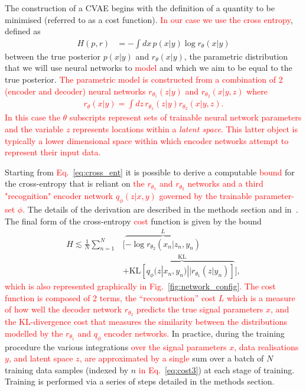 \documentclass[%
showpacs,
nofootinbib,
 amsmath,amssymb,
 aps,
 twocolumn,
 prl,
 reprint,
floatfix,
]{revtex4-1}
\newcommand{\new}[1]{\textcolor{red}{#1}}
\begin{document}
%
%
The construction of a \ac{CVAE} begins with the definition of a quantity to be
minimised (referred to as a cost function). \new{In our case we use the cross
entropy}, defined as
%
\begin{align}\label{eq:cross_ent} 
H(p,r) &= -\int dx\, p(x|y) \log r_{\theta}(x|y) 
\end{align}
%
between the true posterior $p(x|y)$ and $r_{\theta}(x|y)$, the parametric
distribution that we will use neural networks to \new{model} and which we aim
to be equal to the true posterior. \new{The parametric model is constructed from a
combination of 2 (encoder and decoder) neural networks $r_{\theta_1}(z|y)$ and
$r_{\theta_2}(x|y,z)$ where
%
\begin{align}\label{eq:latent_model}
r_{\theta}(x|y) = \int dz\,r_{\theta_1}(z|y)r_{\theta_2}(x|y,z).
\end{align}
%
In this case the $\theta$ subscripts represent sets of trainable neural
network parameters and the variable $z$ represents locations within a
\emph{latent space}. This latter object is typically a lower dimensional space
within which encoder networks attempt to represent their input data.}

Starting from \new{Eq.~\ref{eq:cross_ent}} it is possible to derive a
computable \new{bound} for the cross-entropy that is reliant on \new{the
$r_{\theta_1}$ and $r_{\theta_2}$ networks and a third "recognition" encoder network
$q_{\phi}(z|x,y)$ governed by the trainable parameter-set $\phi$.} The details
of the derivation are described in the methods section and
in~\cite{1904.06264}. The final form of the cross-entropy \new{cost} function is
given by the bound
%
\begin{align}\label{eq:cost3} H \lesssim
\frac{1}{N}\sum_{n=1}^{N}&\Big[\overbrace{-\log
r_{\theta_{2}}(x_{n}|z_{n},y_{n})}^{L}\nonumber\\
&+\overbrace{\text{KL}\left[q_{\phi}(z|x_{n},y_{n})||r_{\theta_{1}}(z|y_{n})\right]}^{\text{KL}}\Big],
\end{align}
%
\new{which is also represented graphically in Fig.~\ref{fig:network_config}. The cost
function is composed of 2 terms, the ``reconstruction'' cost $L$ which is a
measure of how well the decoder network $r_{\theta_2}$ predicts the true signal
parameters $x$, and the \ac{KL}-divergence cost that measures the similarity
between the distributions modelled by the $r_{\theta_1}$ and $q_{\phi}$ encoder
networks.} In practice, during the training procedure the various integrations
\new{over the signal parameters $x$, data realisations $y$, and latent space $z$,
are approximated by a single} sum over a batch of $N$ training data samples
(indexed by $n$ \new{in Eq.~\ref{eq:cost3}}) at each stage of training. Training is
performed via a series of steps detailed in the methods section.
\end{document}
